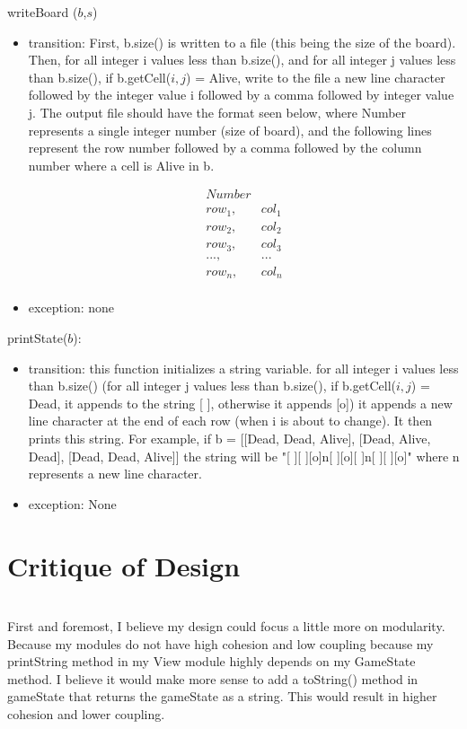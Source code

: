 \documentclass[12pt]{article}
\begin{document}
\noindent writeBoard ($b$,$s$)
\begin{itemize}
\item transition: First, b.size()  is written to a file (this being the size of the board).
  Then, for all integer i values less than b.size(), and for all integer j values less than
  b.size(), if b.getCell($i,j$) = Alive, write to the file a new line character followed by the integer value i followed by a
  comma followed by integer value j. The output file should
  have the format seen below, where Number represents a single integer number (size of board),
  and the following lines represent the row number followed by a comma followed by the column
  number where a cell is Alive in b.

  \begin{equation}
    \begin{array}{ccccccc}
      Number\\
      row_1, & col_1\\
      row_2, & col_2\\
      row_3, & col_3
      \\
      ..., & ...
      \\
      row_n, & col_n \\
    \end{array}
  \end{equation}

\item exception: none
\end{itemize}


\noindent printState($b$):
\begin{itemize}
\item transition: this function initializes a string variable.
  for all integer i values less than b.size() (for all integer j values less than
  b.size(), if b.getCell($i,j$) = Dead, it appends to the string [ ], otherwise it appends [o])
  it appends a new line character at the end of each row (when i is about to change).
  It then prints this string. For example, if b = [[Dead, Dead, Alive], [Dead, Alive, Dead], [Dead, Dead, Alive]]
  the string will be "[ ][ ][o]n[ ][o][ ]n[ ][ ][o]" where n represents a new line character.


\item exception: None
\end{itemize}

\newpage
  \section* {Critique of Design}
  \\
  First and foremost, I believe my design could focus a little more on modularity.
  Because my modules do not have high cohesion and low coupling because my printString method in
  my View module highly depends on my GameState method. I believe it would make more sense to add a
  toString() method in gameState that returns the gameState as a string. This would result in
  higher cohesion and lower coupling. \\\\
\end{document}
